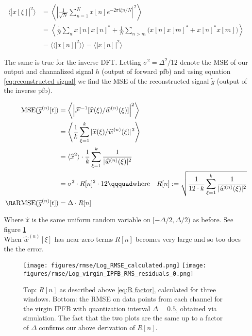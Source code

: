 \documentclass[12pt]{article}
\begin{document}
\begin{equation}
\begin{split}
    \langle |\widehat x[\xi]|^2\rangle 
    & = \left\langle \left| \frac{1}{\sqrt N}\sum_{n=1}^N x[n] e^{-2\pi i \xi n/N}\right|^2 \right\rangle \\
    &= \left\langle \frac{1}{N}\sum_n x[n]x[n]^\ast + \frac{1}{N} \sum_{n > m}\big(x[n]x[m]^\ast + x[n]^\ast x[m]\big)\right\rangle \\
    &= \langle \langle |x[n]|^2\rangle \rangle = \langle |x[n]|^2 \rangle
\end{split}
\end{equation}

The same is true for the inverse DFT. Letting $\sigma^2 = \Delta^2/12$ denote the MSE of our output and channalized signal $h$ (output of forward pfb) and using equation \eqref{eq:reconstructed signal} we find the MSE of the reconstructed signal $\widetilde g$ (output of the inverse pfb). 

\begin{equation}\label{eq:R factor}
\begin{split}
    \text{MSE}(\widetilde g^{(n)}[t]) &= \left\langle \left| \mathcal F^{-1} [\widehat x(\xi)/\widehat w^{(n)}(\xi)] \right|^2 \right\rangle \\
    &= \left\langle \frac{1}{k}\sum_{\xi=1}^k |\widehat x(\xi)/ \widehat w^{(n)}(\xi)|^2 \right\rangle \\
    &= \langle \widehat x^2 \rangle \cdot \frac{1}{k}\sum_{\xi=1}^k  \frac{1}{|\widehat w^{(n)}(\xi)|^2} \\
    &= \sigma^2 \cdot R[n]^2 \cdot 12 \qqquad\text{where}\quad R[n]:= \sqrt{ \frac{1}{12\cdot k}\sum_{\xi=1}^k \frac{1}{|\widehat w^{(n)}(\xi)|^2} } \\
    \RA\text{RMSE}(\widetilde g^{(n)}[t]) &= \Delta \cdot R[n] 
\end{split}
\end{equation}

Where $\widehat x$ is the same uniform random variable on $[-\Delta/2,\Delta/2)$ as before. See figure \ref{fig:quantization RMSE} \\ 

When $\widehat w^{(n)}[\xi]$ has near-zero terms $R[n]$ becomes very large and so too does the the error. 

\begin{figure}[H]
    \centering
    \texttt{[image: figures/rmse/Log\_RMSE\_calculated.png]}
    \texttt{[image: figures/rmse/Log\_virgin\_IPFB\_RMS\_residuals\_0.png]}
    
    \caption{Top: $R[n]$ as described above \eqref{eq:R factor}, calculated for three windows. Bottom: the RMSE on data points from each channel for the virgin IPFB with quantization interval $\Delta=0.5$, obtained via simulation. The fact that the two plots are the same up to a factor of $\Delta$ confirms our above derivation of $R[n]$. }
    \label{fig:quantization RMSE}
\end{figure}
\end{document}

